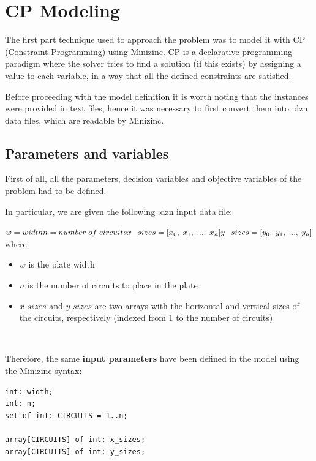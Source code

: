 \section{CP Modeling}

The first part technique used to approach the problem was to model it with CP (Constraint Programming) using Minizinc. CP is a declarative programming paradigm where the solver tries to find a solution (if this exists) by assigning a value to each variable, in a way that all the defined constraints are satisfied.

Before proceeding with the model definition it is worth noting that the instances were provided in text files, hence it was necessary to first convert them into .dzn data files, which are readable by Minizinc.

\subsection{Parameters and variables}

First of all, all the parameters, decision variables and objective variables of the problem had to be defined. 

In particular, we are given the following .dzn input data file:

$w = {width} \\
n = {number \; of \; circuits} \\
x\_sizes = [{x_0}, \; {x_1}, \; ..., \; {x_n}] \\
y\_sizes = [{y_0}, \; {y_1}, \; ..., \; {y_n}]$ \\

where:
\begin{itemize}
    \item $w$ is the plate width
    \item $n$ is the number of circuits to place in the plate
    \item $x\_sizes$ and $y\_sizes$ are two arrays with the horizontal and vertical sizes of the circuits, respectively (indexed from 1 to the number of circuits)
\end{itemize}\

Therefore, the same \textbf{input parameters} have been defined in the model using the Minizinc syntax:

\begin{verbatim}
int: width;
int: n;
set of int: CIRCUITS = 1..n; 

array[CIRCUITS] of int: x_sizes; 
array[CIRCUITS] of int: y_sizes; 
\end{verbatim}



